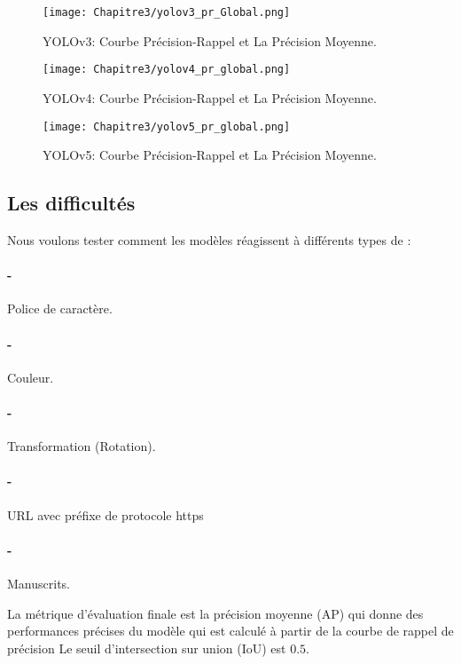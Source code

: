      \begin{figure}[H]
               \centering
               \texttt{[image: Chapitre3/yolov3\_pr\_Global.png]}
               \caption{YOLOv3: Courbe Précision-Rappel et La Précision Moyenne.}
               \label{y3_pr}
               \end{figure}
     \begin{figure}[H]
               \centering
               \texttt{[image: Chapitre3/yolov4\_pr\_global.png]}
               \caption{YOLOv4: Courbe Précision-Rappel et La Précision Moyenne.}
               \label{y4_pr}
               \end{figure}
     \begin{figure}[H]
               \centering
               \texttt{[image: Chapitre3/yolov5\_pr\_global.png]}
               \caption{YOLOv5: Courbe Précision-Rappel et La Précision Moyenne.}
               \label{y5_pr}
               \end{figure}
     
     \subsection{Les difficultés}

          Nous voulons tester comment les modèles réagissent à différents types de :
          \paragraph{-} Police de caractère.
          \paragraph{-} Couleur.
          \paragraph{-} Transformation (Rotation).
          \paragraph{-} URL avec préfixe de protocole https
          \paragraph{-} Manuscrits.
               
          La métrique d'évaluation finale est la précision moyenne (AP) qui donne des performances précises du modèle qui est calculé à partir de la courbe de rappel de précision
          Le seuil d'intersection sur union (IoU) est $0.5$.

